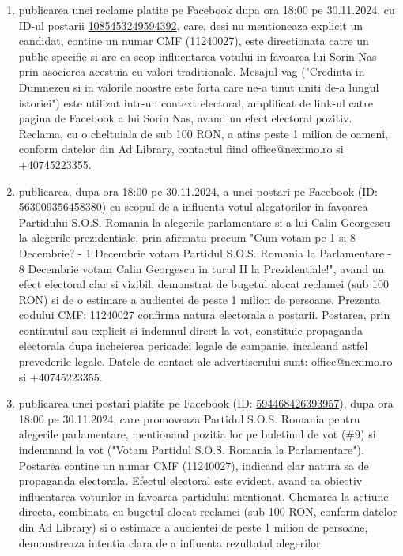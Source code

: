 \documentclass[a4paper,12pt]{article}
\begin{document}
\begin{enumerate}[leftmargin=*, label=\arabic*.)]
    \item publicarea unei reclame platite pe Facebook dupa ora 18:00 pe 30.11.2024, cu ID-ul postarii \href{https://www.facebook.com/ads/library/?id=1085453249594392}{1085453249594392}, care, desi nu mentioneaza explicit un candidat, contine un numar CMF (11240027), este directionata catre un public specific si are ca scop influentarea votului in favoarea lui Sorin Nas prin asocierea acestuia cu valori traditionale.  Mesajul vag ("Credinta in Dumnezeu si in valorile noastre este forta care ne-a tinut uniti de-a lungul istoriei") este utilizat intr-un context electoral, amplificat de link-ul catre pagina de Facebook a lui Sorin Nas, avand un efect electoral pozitiv.  Reclama, cu o cheltuiala de sub 100 RON, a atins peste 1 milion de oameni, conform datelor din Ad Library, contactul fiind office@neximo.ro si +40745223355.
    \item publicarea, dupa ora 18:00 pe 30.11.2024, a unei postari pe Facebook (ID: \href{https://www.facebook.com/ads/library/?id=563009356458380}{563009356458380}) cu scopul de a influenta votul alegatorilor in favoarea Partidului S.O.S. Romania la alegerile parlamentare si a lui Calin Georgescu la alegerile prezidentiale,  prin afirmatii precum "Cum votam pe 1 si 8 Decembrie? - 1 Decembrie votam Partidul S.O.S. Romania la Parlamentare - 8 Decembrie votam Calin Georgescu in turul II la Prezidentiale!",  avand un efect electoral clar si vizibil, demonstrat de bugetul alocat reclamei (sub 100 RON) si de o estimare a audientei de peste 1 milion de persoane. Prezenta codului CMF: 11240027 confirma natura electorala a postarii.  Postarea, prin continutul sau explicit si indemnul direct la vot, constituie propaganda electorala dupa incheierea perioadei legale de campanie, incalcand astfel prevederile legale.  Datele de contact ale advertiserului sunt: office@neximo.ro si +40745223355.
    \item publicarea unei postari platite pe Facebook (ID: \href{https://www.facebook.com/ads/library/?id=594468426393957}{594468426393957}), dupa ora 18:00 pe 30.11.2024, care promoveaza Partidul S.O.S. Romania pentru alegerile parlamentare, mentionand pozitia lor pe buletinul de vot (\#9) si indemnand la vot ("Votam Partidul S.O.S. Romania la Parlamentare").  Postarea contine un numar CMF (11240027), indicand clar natura sa de propaganda electorala.  Efectul electoral este evident, avand ca obiectiv influentarea voturilor in favoarea partidului mentionat.  Chemarea la actiune directa, combinata cu bugetul alocat reclamei (sub 100 RON, conform datelor din Ad Library) si o estimare a audientei de peste 1 milion de persoane, demonstreaza intentia clara de a influenta rezultatul alegerilor.
\end{enumerate}
\end{document}
